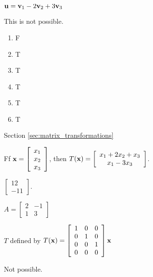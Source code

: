 \begin{multicols}{2}
	\item $\mathbf{u} = \mathbf{v}_1 - 2 \mathbf{v}_2 + 3 \mathbf{v}_3$

	\ea
	
\item This is not possible. 

\item
\begin{enumerate}[label=(\alph*), leftmargin=1\parindent]
\item F
\item T
\item T
\item T
\item T
\item T
\end{enumerate}


\oee

\hspace{-0.25in} Section \ref{sec:matrix_transformations}

\obe 
\item Ff $\mathbf{x} = \left[ \begin{array}{c} x_1\\x_2\\x_3 \end{array} \right]$, then 
$T(\mathbf{x}) =  \left[ \begin{array}{c} x_1+2x_2+x_3 \\ x_1-3x_3 \end{array} \right]$.

\item $\left[ \begin{array}{r} 12 \\ -11 \end{array} \right]$.

\item $A = \left[ \begin{array}{cr} 2&-1\\1&3 \end{array} \right]$

\item $T$ defined by $T(\mathbf{x}) = \left[ \begin{array}{ccc} 1&0&0 \\ 0&1&0 \\ 0&0&1 \\0&0&0 \end{array} \right]\mathbf{x}$ 

\item Not possible.


\end{multicols}
